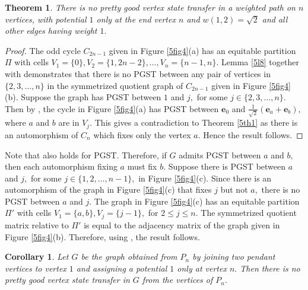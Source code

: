 \documentclass[12pt,a4paper]{article}
\newtheorem{thm}{Theorem}
\newtheorem{cor}{Corollary}
\def \e {{\bf e}}
\def \e {{\mathbf e}}
\newcommand{\ob}[1]{\left(#1\right)}
\begin{document}
\begin{thm}
    There is no pretty good vertex state transfer in a weighted path on $n$ vertices, with potential $1$ only at the end vertex $n$ and $w(1,2)=\sqrt{2}$ and all other edges having weight $1.$ 
\end{thm}
\begin{proof}
    The odd cycle $C_{2n-1}$ given in Figure \ref{5fig4}(a) has an equitable partition $\Pi$ with cells $V_1=\{0\}, V_2=\{1, 2n-2\},\ldots, V_{n}=\{n-1,n\}.$
  Lemma \ref{5l8} together with \cite[Remark 5]{god8} demonstrates that there is no PGST between any pair of vertices in  $\{2,3,\ldots,n\}$ in the symmetrized quotient graph of $C_{2n-1}$ given in Figure \ref{5fig4}(b). Suppose the graph has PGST between $1$ and $j,$ for some $j\in\{2,3,\ldots,n\}.$ Then by \cite[Remark 5]{god8}, the cycle in Figure \ref{5fig4}(a)
 has PGST between $\e_0$ and $\frac{1}{\sqrt{2}}\ob{\e_a+\e_b},$ where $a$ and $b$ are in $V_j.$ This gives a contradiction to Theorem \ref{5th1} as there is an automorphism of $C_n$ which fixes only the vertex $a.$ Hence the result follows.  
\end{proof} 
 
 

Note that \cite[Corollary 9.2]{god1} also holds for PGST. Therefore, if $G$ admits PGST between $a$ and $b,$ then each automorphism fixing $a$ must fix $b.$ Suppose there is PGST between $a$ and $j,$ for some $j\in\{1,2,\ldots, n-1\},$ in Figure \ref{5fig4}(c). Since there is an automorphism of the graph in Figure \ref{5fig4}(c) that fixes $j$ but not $a,$ there is no PGST between $a$ and $j.$
 The graph in Figure \ref{5fig4}(c) has an equitable partition $\Pi'$ with cells $V_1=\{a,b\}, V_j=\{j-1\},$ for $2\leq j\leq n.$ The symmetrized quotient matrix relative to $\Pi'$ is equal to the adjacency matrix of the graph given in Figure \ref{5fig4}(b). Therefore, using \cite[Remark 5]{god8}, the result follows.
\begin{cor}
Let $G$ be the graph obtained from $P_n$ by joining two pendant vertices to vertex 
$1$ and assigning a potential 
$1$ only at vertex $n.$ Then there is no pretty good vertex state transfer in
$G$ from the vertices of $P_n.$ 
\end{cor}
\end{document}
